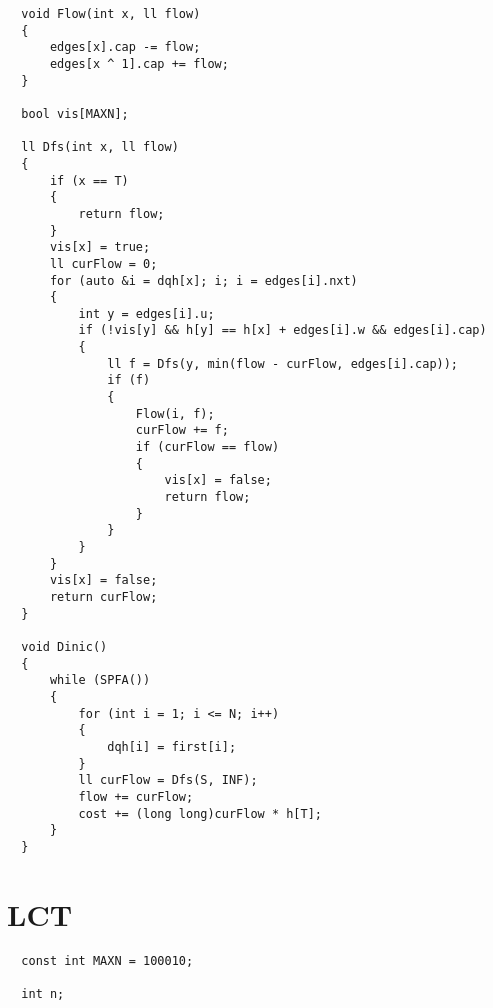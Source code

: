 \documentclass{article}
\begin{document}
\begin{multicols}{3}
\begin{lstlisting}
  void Flow(int x, ll flow)
  {
      edges[x].cap -= flow;
      edges[x ^ 1].cap += flow;
  }
  
  bool vis[MAXN];
  
  ll Dfs(int x, ll flow)
  {
      if (x == T)
      {
          return flow;
      }
      vis[x] = true;
      ll curFlow = 0;
      for (auto &i = dqh[x]; i; i = edges[i].nxt)
      {
          int y = edges[i].u;
          if (!vis[y] && h[y] == h[x] + edges[i].w && edges[i].cap)
          {
              ll f = Dfs(y, min(flow - curFlow, edges[i].cap));
              if (f)
              {
                  Flow(i, f);
                  curFlow += f;
                  if (curFlow == flow)
                  {
                      vis[x] = false;
                      return flow;
                  }
              }
          }
      }
      vis[x] = false;
      return curFlow;
  }
  
  void Dinic()
  {
      while (SPFA())
      {
          for (int i = 1; i <= N; i++)
          {
              dqh[i] = first[i];
          }
          ll curFlow = Dfs(S, INF);
          flow += curFlow;
          cost += (long long)curFlow * h[T];
      }
  }
\end{lstlisting}

\section*{LCT}
\begin{lstlisting}
  const int MAXN = 100010;
  
  int n;
  

\end{lstlisting}
\end{multicols}
\end{document}
